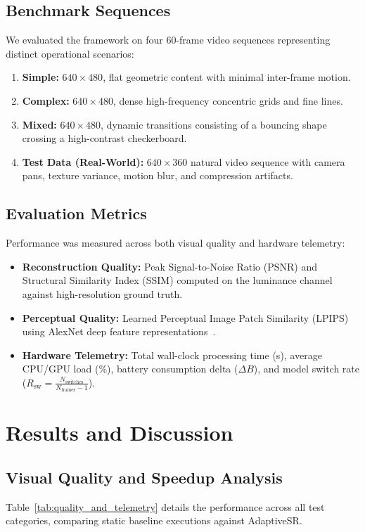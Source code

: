 \documentclass[conference]{IEEEtran}
\begin{document}
\subsection{Benchmark Sequences}
We evaluated the framework on four 60-frame video sequences representing distinct operational scenarios:
\begin{enumerate}
    \item \textbf{Simple:} $640 \times 480$, flat geometric content with minimal inter-frame motion.
    \item \textbf{Complex:} $640 \times 480$, dense high-frequency concentric grids and fine lines.
    \item \textbf{Mixed:} $640 \times 480$, dynamic transitions consisting of a bouncing shape crossing a high-contrast checkerboard.
    \item \textbf{Test Data (Real-World):} $640 \times 360$ natural video sequence with camera pans, texture variance, motion blur, and compression artifacts.
\end{enumerate}

\subsection{Evaluation Metrics}
Performance was measured across both visual quality and hardware telemetry:
\begin{itemize}
    \item \textbf{Reconstruction Quality:} Peak Signal-to-Noise Ratio (PSNR) and Structural Similarity Index (SSIM) computed on the luminance channel against high-resolution ground truth.
    \item \textbf{Perceptual Quality:} Learned Perceptual Image Patch Similarity (LPIPS) using AlexNet deep feature representations~\cite{zhang2018unreasonable}.
    \item \textbf{Hardware Telemetry:} Total wall-clock processing time (s), average CPU/GPU load (\%), battery consumption delta ($\Delta B$), and model switch rate ($R_{\text{sw}} = \frac{N_{\text{switches}}}{N_{\text{frames}}-1}$).
\end{itemize}

\section{Results and Discussion}

\subsection{Visual Quality and Speedup Analysis}
Table~\ref{tab:quality_and_telemetry} details the performance across all test categories, comparing static baseline executions against AdaptiveSR.
\end{document}
